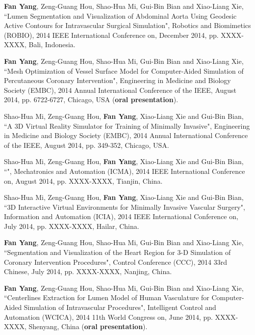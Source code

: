 
\begin{publications}{99}

\item \textbf{Fan Yang}, Zeng-Guang Hou, Shao-Hua Mi, Gui-Bin Bian and Xiao-Liang Xie, ``Lumen Segmentation and Visualization of Abdominal Aorta Using Geodesic Active Contours for Intravascular Surgical Simulation", Robotics and Biomimetics (ROBIO), 2014 IEEE International Conference on, December 2014, pp. XXXX-XXXX, Bali, Indonesia.%

\item \textbf{Fan Yang}, Zeng-Guang Hou, Shao-Hua Mi, Gui-Bin Bian and Xiao-Liang Xie, ``Mesh Optimization of Vessel Surface Model for Computer-Aided Simulation of Percutaneous Coronary Intervention", Engineering in Medicine and Biology Society (EMBC), 2014 Annual International Conference of the IEEE, August 2014, pp. 6722-6727, Chicago, USA (\textbf{oral presentation}).%

\item Shao-Hua Mi, Zeng-Guang Hou, \textbf{Fan Yang}, Xiao-Liang Xie and Gui-Bin Bian, ``A 3D Virtual Reality Simulator for Training of Minimally Invasive", Engineering in Medicine and Biology Society (EMBC), 2014 Annual International Conference of the IEEE, August 2014, pp. 349-352, Chicago, USA.%

\item Shao-Hua Mi, Zeng-Guang Hou, \textbf{Fan Yang}, Xiao-Liang Xie and Gui-Bin Bian, ``", Mechatronics and Automation (ICMA), 2014 IEEE International Conference on, August 2014, pp. XXXX-XXXX, Tianjin, China.%

\item Shao-Hua Mi, Zeng-Guang Hou, \textbf{Fan Yang}, Xiao-Liang Xie and Gui-Bin Bian, ``3D Interactive Virtual Environments for Minimally Invasive Vascular Surgery", Information and Automation (ICIA), 2014 IEEE International Conference on, July 2014, pp. XXXX-XXXX, Hailar, China.%

\item \textbf{Fan Yang}, Zeng-Guang Hou, Shao-Hua Mi, Gui-Bin Bian and Xiao-Liang Xie, ``Segmentation and Visualization of the Heart Region for 3-D Simulation of Coronary Intervention Procedures", Control Conference (CCC), 2014 33rd Chinese, July 2014, pp. XXXX-XXXX, Nanjing, China.%

\item \textbf{Fan Yang}, Zeng-Guang Hou, Shao-Hua Mi, Gui-Bin Bian and Xiao-Liang Xie, ``Centerlines Extraction for Lumen Model of Human Vasculature for Computer-Aided Simulation of Intravascular Procedures", Intelligent Control and Automation (WCICA), 2014 11th World Congress on, June 2014, pp. XXXX-XXXX, Shenyang, China (\textbf{oral presentation}).%


\end{publications}
